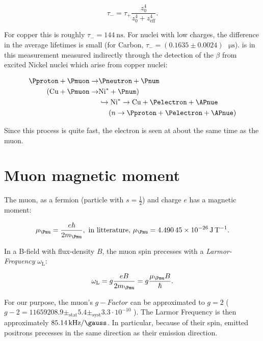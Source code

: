 \begin{equation}
\tau_-=\tau_+\frac{z_0^4}{z_0^4+z_{\text{eff}}^4}.
\end{equation}

For copper this is roughly $\tau_-=\SI{144}{\nano\second}$. For nuclei with low charges, the difference in the average lifetimes is small (for Carbon, $\tau_-=(0.1635 \pm 0.0024)\text{ }\si{\micro\second}$). \Pmuon is in this measurement measured indirectly through the detection of the $\beta$ from excited Nickel nuclei which arise from copper nuclei:

\begin{equation}
\begin{split}
\Pproton+\Pmuon \rightarrow&\Pneutron+\Pnum \\
(\text{Cu}+\Pmuon\rightarrow &\text{Ni}^*+\Pnum) \\
&\hookrightarrow\text{Ni}^*\rightarrow \text{Cu} + \Pelectron + \APnue \\
&\hspace{0.5cm}(n\rightarrow\Pproton+\Pelectron+\APnue)
\end{split}
\end{equation}

Since this process is quite fast, the electron is seen at about the same time as the muon.


\section{Muon magnetic moment}

The muon, as a fermion (particle with $s=\frac{1}{2}$) and charge $e$ has a magnetic moment:

\begin{equation}
\mu_{\Pmu}=\frac{e\hbar}{2m_{\Pmu}},\text{ in litterature, } \mu_{\Pmu}=\SI{4.49045e-26}{\joule\per\tesla}.
\end{equation}

In a B-field with flux-density $B$, the muon spin precesses with a \textit{Larmor-Frequency} $\omega_{\text{L}}$:

\begin{equation}
\label{eq:larm}
\omega_{\text{L}}=g\frac{eB}{2m_{\Pmu}}=g\frac{\mu_{\Pmu}B}{\hbar}.
\end{equation}

For our purpose, the muon's $g-Factor$ can be approximated to $g=2$ ($g-2=11659208.9\pm_{\text{stat}}5.4\pm_{\text{syst}}3.3\cdot 10^{-10}$ \cite{Tanabashi:2018oca}). The Larmor Frequency is then approximately $\SI{85.14}{\kilo \hertz \per \gauss}$. In particular, because of their spin, emitted positrons precesses in the same direction as their emission direction.


